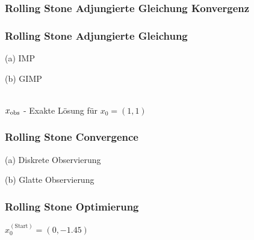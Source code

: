 \begin{frame}[<+->]
\frametitle{Rolling Stone Adjungierte Gleichung Konvergenz}
\centering
 
\end{frame}
\begin{frame}[<+->]
\frametitle{Rolling Stone Adjungierte Gleichung}
\begin{minipage}[c]{0.45\textwidth}
\centering
 
(a) IMP
\end{minipage}
\begin{minipage}[c]{0.45\textwidth}
\centering

(b) GIMP
\end{minipage}
\hfill
\centering
\\[0.6cm]
$x_\text{obs}$ - Exakte Lösung für $x_0=(1,1)$
\end{frame}

\begin{frame}[<+->]
\frametitle{Rolling Stone Convergence}
\centering
\begin{minipage}[c]{0.49\textwidth}
\centering
 
(a) Diskrete Observierung
\end{minipage}
\hfill
\begin{minipage}[c]{0.49\textwidth}
\centering
 
(b) Glatte Observierung
\end{minipage}

\end{frame}

\begin{frame}[<+->]
\frametitle{Rolling Stone Optimierung}
\begin{minipage}[c]{0.49\textwidth}
\centering
 
\end{minipage}
\hfill
\begin{minipage}[c]{0.49\textwidth}
\centering
  
\end{minipage}
\centering
$
x_0^{(\text{Start})}=(0,-1.45) 
$

\end{frame}


